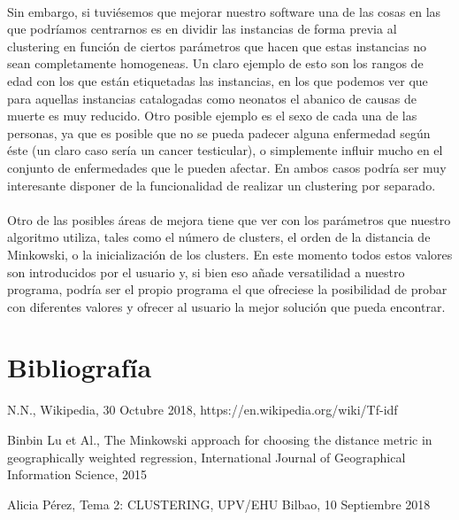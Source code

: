 \documentclass[10pt,a4paper]{article}
\begin{document}
	\paragraph{}
	Sin embargo, si tuviésemos que mejorar nuestro software una de las cosas en las que podríamos centrarnos es en dividir las instancias de forma previa al clustering en función de ciertos parámetros que hacen que estas instancias no sean completamente homogeneas. Un claro ejemplo de esto son los rangos de edad con los que están etiquetadas las instancias, en los que podemos ver que para aquellas instancias catalogadas como neonatos el abanico de causas de muerte es muy reducido. Otro posible ejemplo es el sexo de cada una de las personas, ya que es posible que no se pueda padecer alguna enfermedad según éste (un claro caso sería un cancer testicular), o simplemente influir mucho en el conjunto de enfermedades que le pueden afectar. En ambos casos podría ser muy interesante disponer de la funcionalidad de realizar un clustering por separado.
	\paragraph{}
	Otro de las posibles áreas de mejora tiene que ver con los parámetros que nuestro algoritmo utiliza, tales como el número de clusters, el orden de la distancia de Minkowski, o la inicialización de los clusters. En este momento todos estos valores son introducidos por el usuario y, si bien eso añade versatilidad a nuestro programa, podría ser el propio programa el que ofreciese la posibilidad de probar con diferentes valores y ofrecer al usuario la mejor solución que pueda encontrar.
\section{Bibliografía}
\def\section*#1{} %

\begin{thebibliography}{}
N.N., Wikipedia, 30 Octubre 2018, https://en.wikipedia.org/wiki/Tf-idf 

Binbin Lu et Al., The Minkowski approach for choosing the distance metric in geographically weighted regression, International Journal of Geographical Information Science, 2015

Alicia Pérez, Tema 2: CLUSTERING, UPV/EHU Bilbao, 10 Septiembre 2018


\end{thebibliography}
\end{document}
